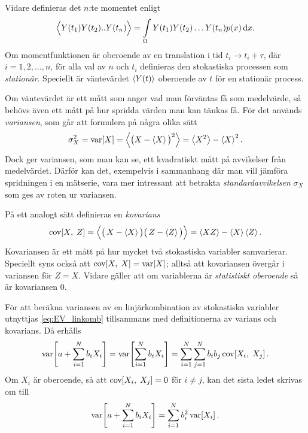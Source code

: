 Vidare definieras det $n$:te momentet enligt 
\begin{equation}
\Big\langle Y(t_1)Y(t_2)..Y(t_n) \Big\rangle 
= \int_{\Omega} Y(t_1)Y(t_2)\ldots Y(t_n)p(x)\id{x}.
\end{equation}
Om momentfunktionen är oberoende av en translation i tid $t_i\to t_i+\tau$, där $i=1,2,\ldots,n$, för alla val av $n$ och $t_i$ definieras den stokastiska processen som \emph{stationär}. Speciellt är väntevärdet $\ev{Y(t)}$ oberoende av $t$ för en stationär process. 

Om väntevärdet är ett mått som anger vad man förväntas få som medelvärde, så behövs även ett mått på hur spridda värden man kan tänkas få. För det används \emph{variansen}, som går att formulera på några olika sätt~\cite{Rice_matstat2006}
\begin{equation}\label{eq:VAR}
\sigma_X^2=\VAR{X} = \ev{\big(X-\ev{X} \big)^2} = \ev{X^2}-\ev{X}^2.
\end{equation}
Dock ger variansen, som man kan se, ett kvadratiskt mått på avvikelser från medelvärdet. Därför kan det, exempelvis i sammanhang där man vill jämföra spridningen i en mätserie, vara mer intressant att betrakta \emph{standardavvikelsen} $\sigma_X$ som ges av roten ur variansen.


På ett analogt sätt definieras en \emph{kovarians}~\cite{Rice_matstat2006}
\begin{equation}\label{eq:COV}
\COV{X}{Z} 
= \Big\langle \big(\, X-\ev{X}\big) \big(\, Z-\ev{Z}\big) \Big\rangle
= \ev{XZ}-\ev{X}\ev{Z}.
\end{equation}
Kovariansen är ett mått på hur mycket två stokastiska variabler samvarierar. Speciellt syns också att $\text{cov}\!\left[X,\;X\right]=\text{var}\!\left[X\right]$; alltså att kovariansen övergår i variansen för $Z=X$. Vidare gäller att om variablerna är \emph{statistiskt oberoende} så är kovariansen 0.

För att beräkna variansen av en linjärkombination av stokastiska variabler utnyttjas \eqref{eq:EV_linkomb} tillsammans med definitionerna av varians och kovarians. Då erhålls
\begin{equation}
\text{var}\!\left[a+\sum_{i=1}^N b_i X_i\right] = \text{var}\!\left[\sum_{i=1}^N b_i X_i\right] 
= \sum_{i=1}^N\sum_{j=1}^N b_i b_j\, \text{cov}\!\left[X_i,\;X_j\right].
\end{equation}
Om $X_i$ är oberoende, så att $\text{cov}\!\left[X_i,\;X_j\right]=0$ för $i\neq j$, kan det sista ledet skrivas om till
\begin{equation}\label{eq:VAR_linkomb}
\text{var}\!\left[a+\sum_{i=1}^N b_i X_i\right] = \sum_{i=1}^N b_i^2\, \text{var}\!\left[X_i\right].
\end{equation}




